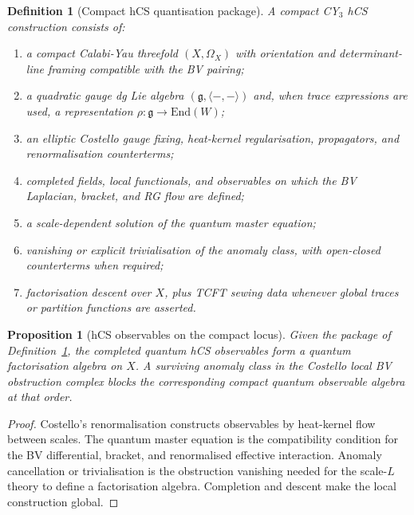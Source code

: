 \documentclass[11pt]{article}
\newtheorem{proposition}[theorem]{Proposition}
\newtheorem{definition}[theorem]{Definition}
\begin{document}
\begin{definition}[Compact hCS quantisation package]
\label{def:compact-hcs-package}
A compact CY$_3$ hCS construction consists of:
\begin{enumerate}[label=\textup{(\roman*)}]
\item a compact Calabi-Yau threefold $(X,\Omega_X)$ with orientation
and determinant-line framing compatible with the BV pairing;
\item a quadratic gauge dg Lie algebra
$(\mathfrak g,\langle-,-\rangle)$ and, when trace expressions are used,
a representation $\rho\colon\mathfrak g\to\mathrm{End}(W)$;
\item an elliptic Costello gauge fixing, heat-kernel regularisation,
propagators, and renormalisation counterterms;
\item completed fields, local functionals, and observables on which the
BV Laplacian, bracket, and RG flow are defined;
\item a scale-dependent solution of the quantum master equation;
\item vanishing or explicit trivialisation of the anomaly class, with
open-closed counterterms when required;
\item factorisation descent over $X$, plus TCFT sewing data whenever
global traces or partition functions are asserted.
\end{enumerate}
\end{definition}

\begin{proposition}[hCS observables on the compact locus]
\label{prop:compact-hcs}
Given the package of Definition~\ref{def:compact-hcs-package}, the
completed quantum hCS observables form a quantum factorisation algebra
on $X$.  A surviving anomaly class in the Costello local BV obstruction
complex blocks the corresponding compact quantum observable algebra at
that order.
\end{proposition}

\begin{proof}
Costello's renormalisation constructs observables by heat-kernel flow
between scales.  The quantum master equation is the compatibility
condition for the BV differential, bracket, and renormalised effective
interaction.  Anomaly cancellation or trivialisation is the obstruction
vanishing needed for the scale-$L$ theory to define a factorisation
algebra.  Completion and descent make the local construction global.
\end{proof}
\end{document}
